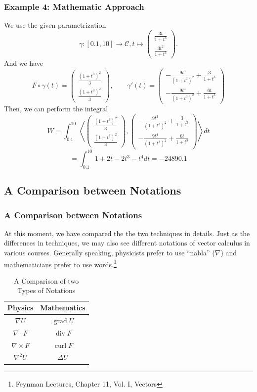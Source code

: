 \documentclass[11pt, t]{beamer}
\begin{document}
\begin{frame}
    \frametitle{Example 4: Mathematic Approach}
    We use the given parametrization
    $$\gamma:[0.1,10]\to\mathcal{C},t\mapsto\begin{pmatrix}
            \frac{3t}{1+t^3} \\\frac{3t^2}{1+t^3}
        \end{pmatrix}.$$
    And we have
    $$F\circ\gamma(t)=\begin{pmatrix}
            \frac{(1+t^3)^2}{3} \\
            \frac{(1+t^3)^2}{3}
        \end{pmatrix},\qquad
        \gamma'(t)=\begin{pmatrix}
            -\frac{9t^3}{(1+t^3)^2}+\frac{3}{1+t^3} \\
            -\frac{9t^4}{(1+t^3)^2}+\frac{6t}{1+t^3}
        \end{pmatrix}
    $$
    Then, we can perform the integral
    $$
        W=\int_{0.1}^{10}\left\langle \begin{pmatrix}
            \frac{(1+t^3)^2}{3} \\
            \frac{(1+t^3)^2}{3}
        \end{pmatrix},\begin{pmatrix}
            -\frac{9t^3}{(1+t^3)^2}+\frac{3}{1+t^3} \\
            -\frac{9t^4}{(1+t^3)^2}+\frac{6t}{1+t^3}
        \end{pmatrix}\right\rangle dt$$ $$=\int_{0.1}^{10}1 + 2 t - 2 t^3 - t^4dt=-24890.1$$
\end{frame}

\subsection{A Comparison between Notations}
\begin{frame}
    \frametitle{A Comparison between Notations}
    At this moment, we have compared the the two techniques in details. Just as the differences in techniques, we may also see different notations of vector calculus in various courses. Generally speaking, physicists prefer to use ``nabla'' ($\nabla$) and mathematicians prefer to use words.\footnote[frame]{Feynman Lectures, Chapter 11, Vol. I, Vectors}
    \begin{table}[htbp]
        \centering
        \caption{A Comparison of two Types of Notations}
        \begin{tabular}{cc}
            \hline
            Physics          & Mathematics             \\ \hline
            $\nabla U$       & $\operatorname{grad} U$ \\
            $\nabla\cdot F$  & $\operatorname{div} F$  \\
            $\nabla\times F$ & $\operatorname{curl} F$ \\
            $\nabla^2 U$     & $\Delta U$              \\ \hline
        \end{tabular}
    \end{table}

\end{frame}
\end{document}
